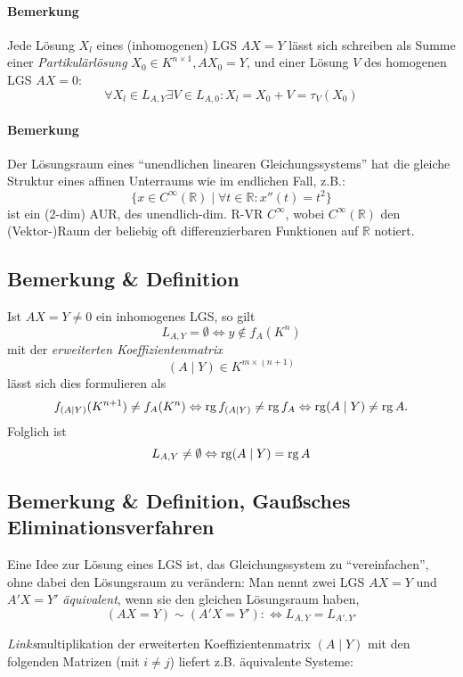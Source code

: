 \paragraph{Bemerkung}
	Jede Lösung $ X_l $ eines (inhomogenen) LGS $AX=Y$ lässt sich schreiben als Summe einer \emph{Partikulärlösung} $ X_0 \in K^{n\times 1},AX_0 = Y $, und einer Lösung $V$ des homogenen LGS $ AX = 0 $:
		\[ \forall X_l\in L_{A,Y}\exists V\in L_{A,0}:X_l=X_0+V=\tau_V(X_0) \]
\paragraph{Bemerkung}
	Der Lösungsraum eines "`unendlichen linearen Gleichungssystems"' hat die gleiche Struktur eines affinen Unterraums wie im endlichen Fall, z.B.:
		\[ \{x\in C^\infty(\mathbb{R})\mid \forall t\in \mathbb{R}:x''(t) = t^2 \} \]
	ist ein (2-dim) AUR, des unendlich-dim. R-VR $C^\infty$, wobei $ C^\infty(\mathbb{R}) $ den (Vektor-)Raum der beliebig oft differenzierbaren Funktionen auf $ \mathbb{R} $ notiert. 
\subsection{Bemerkung \& Definition}
	\begin{Definition}
	Ist $ AX=Y \neq 0$ ein inhomogenes LGS, so gilt
		\[ L_{A,Y} = \emptyset \Leftrightarrow y\notin f_A(K^n) \]
	mit der \emph{erweiterten Koeffizientenmatrix}
		\[ (A\mid Y) \in K^{m\times (n+1)} \]
	lässt sich dies formulieren als
		\[ f_{(A\mid Y)}(K^{n+1})\neq f_A(K^n) \Leftrightarrow \operatorname{rg} f_{(A\mid Y)}\neq \operatorname{rg} f_A \Leftrightarrow \operatorname{rg} (A\mid Y) \neq \operatorname{rg} A. \]
	Folglich ist
		\[ L_{A,Y} \neq \emptyset \Leftrightarrow \operatorname{rg} (A\mid Y) = \operatorname{rg} A \]
	\end{Definition}
\subsection{Bemerkung \& Definition, Gaußsches Eliminationsverfahren}
	\begin{Definition}
	Eine Idee zur Lösung eines LGS ist, das Gleichungssystem zu "`vereinfachen"', ohne dabei den Lösungsraum zu verändern: Man nennt zwei LGS $ AX=Y$ und $A'X=Y' $ \emph{äquivalent}, wenn sie den gleichen Lösungsraum haben,
		\[ (AX=Y)\sim (A'X=Y'):\Leftrightarrow L_{A,Y} = L_{A',Y'} \]
	\end{Definition}
	\emph{Links}multiplikation der erweiterten Koeffizientenmatrix $ (A\mid Y) $ mit den folgenden Matrizen (mit $ i\neq j $) liefert z.B. äquivalente Systeme:

